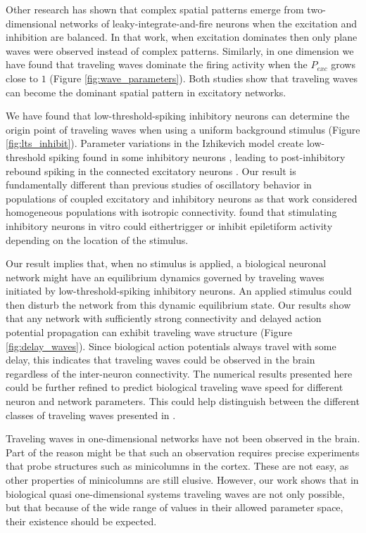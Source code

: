 Other research \citep{keane2015} has shown that complex spatial patterns emerge from two-dimensional networks of leaky-integrate-and-fire neurons when the excitation and inhibition are balanced.
In that work, when excitation dominates then only plane waves were observed instead of complex patterns.
Similarly, in one dimension we have found that traveling waves dominate the firing activity when the $P_{exc}$ grows close to $1$ (Figure \ref{fig:wave_parameters}).
Both studies show that traveling waves can become the dominant spatial pattern in excitatory networks.

We have found that low-threshold-spiking inhibitory neurons can determine the origin point of traveling waves when using a uniform background stimulus (Figure \ref{fig:lts_inhibit}).
Parameter variations in the Izhikevich model \citep{izhikevich2003} create low-threshold spiking found in some inhibitory neurons \citep{gibson2009}\citep{hayut2011}, leading to post-inhibitory rebound spiking in the connected excitatory neurons \citep{ascoli2010}.
Our result is fundamentally different than previous studies of oscillatory behavior in populations of coupled excitatory and inhibitory neurons \citep{Golomb1996}\citep{Golomb1999} as that work considered homogeneous populations with isotropic connectivity.
\citet{Sessolo2015} found that stimulating inhibitory neurons in vitro could eithertrigger or inhibit epiletiform activity depending on the location of the stimulus.

Our result implies that, when no stimulus is applied, a biological neuronal network might have an equilibrium dynamics governed by traveling waves initiated by low-threshold-spiking inhibitory neurons.
An applied stimulus could then disturb the network from this dynamic equilibrium state.
Our results show  that any network with sufficiently strong connectivity and delayed action potential propagation can exhibit traveling wave structure (Figure \ref{fig:delay_waves}).
Since biological action potentials always travel with some delay, this indicates that traveling waves could be observed in the brain regardless of the inter-neuron connectivity.
The numerical results presented here could be further refined to predict biological traveling wave speed for different neuron and network parameters.
This could help distinguish between the different classes of traveling waves presented in \citet{ermentrout2001}.

Traveling waves in one-dimensional networks have not been observed in the brain. 
Part of the reason might be that such an observation requires precise experiments that probe structures such as minicolumns in the cortex. 
These are not easy, as other properties of minicolumns are still elusive. 
However, our work shows that in biological quasi one-dimensional systems  traveling waves are not only possible, but that because of the wide range of values in their allowed parameter space, their existence should be expected.

